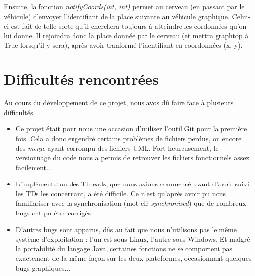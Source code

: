 \documentclass[a4paper, titlepage]{report}
\begin{document}
Ensuite, la fonction \textit{notifyCoords(int, int)} permet au cerveau (en passant par le véhicule) d'envoyer l'identifiant de la place suivante au véhicule graphique. Celui-ci est fait de telle sorte qu'il cherchera toujours à atteindre les cordonnées qu'on lui donne. Il rejoindra donc la place donnée par le cerveau (et mettra graphtop à True lorsqu'il y sera), après avoir tranformé l'identifiant en coordonnées (x, y).

\chapter{Difficultés rencontrées}
Au cours du développement de ce projet, nous avos dû faire face à plusieurs difficultés :
\begin{itemize}
\item Ce projet était pour nous une occasion d'utiliser l'outil Git pour la première fois. Cela a donc engendré certains problèmes de fichiers perdus, ou encore des \textit{merge} ayant corrompu des fichiers UML. Fort heureusement, le versionnage du code nous a permis de retrouver les fichiers fonctionnels assez facilement...
\item L'implémentaton des Threads, que nous avions commencé avant d'avoir suivi les TDs les concernant, a été difficile. Ce n'est qu'après avoir pu nous familiariser avec la synchronisation (mot clé \textit{synchronized}) que de nombreux bugs ont pu être corrigés.
\item D'autres bugs sont apparus, dûs au fait que nous n'utilisons pas le même système d'exploitation : l'un est sous Linux, l'autre sous Windows. Et malgré la portabilité du langage Java, certaines fonctions ne se comportent pas exactement de la même façon sur les deux plateformes, occasionnant quelques bugs graphiques...
\end{itemize}
\end{document}
